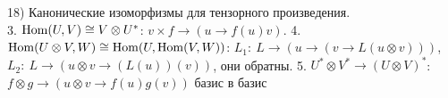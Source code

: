 18) Канонические изоморфизмы для тензорного произведения.\\
3. $\operatorname{Hom} (U,V) \cong V \otimes U^*$: $v\times f \to (u \to f(u)v)$. 4. $ \operatorname{Hom} (U\otimes V,  W) \cong \operatorname{Hom} (U, \operatorname{Hom} (V,W))$: $L_1:\ L \to (u \to (v \to L(u\otimes v)))$, $L_2:\ L \to (u\otimes v \to (L(u))(v))$, они обратны. 5. $U^{*}\otimes V^{*} \to (U \otimes V)^{*}$: $f\otimes g \to (u\otimes v \to f(u)g(v))$ базис в базис\\

